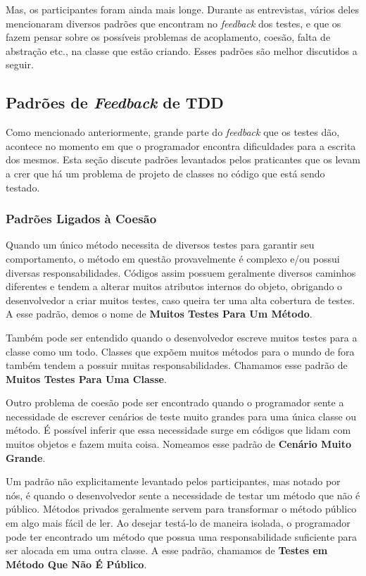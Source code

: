 \documentclass[conference]{IEEEtran}
\begin{document}
Mas, os participantes foram ainda mais longe. Durante as entrevistas,
vários deles mencionaram diversos padrões que encontram no \textit{feedback} dos testes,
e que os fazem pensar sobre os possíveis problemas de acoplamento,
coesão, falta de abstração etc., na classe que estão criando.
Esses padrões são melhor discutidos a seguir.

\subsection{Padrões de \textit{Feedback} de TDD}
\label{padroes-tdd}

Como mencionado anteriormente, grande parte do \textit{feedback} que os testes
dão, acontece no momento em que o programador encontra dificuldades para a
escrita dos mesmos. Esta seção discute padrões levantados pelos praticantes
que os levam a crer que há um problema de projeto de classes no código
que está sendo testado.

\subsubsection{Padrões Ligados à Coesão}

Quando um único método necessita de diversos testes para garantir seu comportamento,
o método em questão provavelmente é complexo e/ou possui diversas responsabilidades.
Códigos assim possuem geralmente diversos caminhos
diferentes e tendem a alterar muitos atributos internos do objeto, obrigando o desenvolvedor
a criar muitos testes, caso queira ter uma alta cobertura de testes.
A esse padrão, demos o nome de \textbf{Muitos Testes Para Um Método}.

Também pode ser entendido quando o desenvolvedor escreve muitos testes para a 
classe como um todo. Classes que expõem muitos métodos para o mundo de fora
também tendem a possuir muitas responsabilidades. Chamamos esse padrão
de \textbf{Muitos Testes Para Uma Classe}.

Outro problema de coesão pode ser encontrado quando o programador
sente a necessidade de escrever cenários de teste muito grandes para uma
única classe ou método. É possível inferir que essa necessidade surge 
em códigos que lidam com muitos objetos e fazem muita coisa. Nomeamos
esse padrão de \textbf{Cenário Muito Grande}.

Um padrão não explicitamente levantado pelos participantes, mas notado
por nós, é quando o desenvolvedor sente a necessidade de testar
um método que não é público. Métodos privados geralmente servem para 
transformar o método público em algo mais fácil de ler. Ao desejar
testá-lo de maneira isolada, o programador pode ter encontrado
um método que possua uma responsabilidade suficiente para ser
alocada em uma outra classe. A esse padrão, chamamos de 
\textbf{Testes em Método Que Não É Público}.
\end{document}
